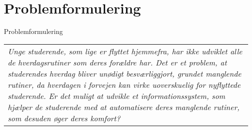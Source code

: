 \section{Problemformulering}
\begin{frame}{Problemformulering}{}
\begin{center}
\begin{tabular}{|p{9cm}|}
\textit{Unge studerende, som lige er flyttet hjemmefra, har ikke udviklet alle de hverdagsrutiner som deres forældre har. Det er et problem, at studerendes hverdag bliver unødigt besværliggjort, grundet manglende rutiner, da hverdagen i forvejen kan virke uoverskuelig for nyflyttede studerende. Er det muligt at udvikle et informationssystem, som hjælper de studerende med at automatisere deres manglende rutiner, som desuden øger deres komfort?}
\end{tabular}
\end{center}
\end{frame}